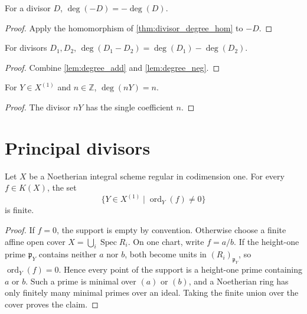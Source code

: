 \begin{lemma}
  \label{lem:degree_neg}
  \leanok
  For a divisor \(D\), \(\deg(-D)=-\deg(D)\).
\end{lemma}
\begin{proof}
  \leanok
  Apply the homomorphism of \cref{thm:divisor_degree_hom} to \(-D\).
\end{proof}

\begin{lemma}
  \label{lem:degree_sub}
  \leanok
  For divisors \(D_1,D_2\),
  \(\deg(D_1-D_2)=\deg(D_1)-\deg(D_2)\).
\end{lemma}
\begin{proof}
  \leanok
  Combine \cref{lem:degree_add} and \cref{lem:degree_neg}.
\end{proof}

\begin{lemma}
  \label{lem:degree_single}
  \leanok
  For \(Y\in X^{(1)}\) and \(n\in\mathbb Z\),
  \(\deg(nY)=n\).
\end{lemma}
\begin{proof}
  \leanok
  The divisor \(nY\) has the single coefficient \(n\).
\end{proof}

\section{Principal divisors}

\begin{lemma}
  \label{lem:rationalMap_order_finite_support}
  \leanok

  Let \(X\) be a Noetherian integral scheme regular in codimension one.
  For every \(f\in K(X)\), the set
  \[
    \{Y\in X^{(1)}\mid\operatorname{ord}_Y(f)\neq0\}
  \]
  is finite.
\end{lemma}
\begin{proof}
  \leanok
  If \(f=0\), the support is empty by convention.  Otherwise choose a finite
  affine open cover \(X=\bigcup_i\operatorname{Spec}R_i\).  On one chart,
  write \(f=a/b\).  If the height-one prime \(\mathfrak p_Y\) contains
  neither \(a\) nor \(b\), both become units in
  \((R_i)_{\mathfrak p_Y}\), so \(\operatorname{ord}_Y(f)=0\).
  Hence every point of the support is a height-one prime containing \(a\)
  or \(b\).  Such a prime is minimal over \((a)\) or \((b)\), and a
  Noetherian ring has only finitely many minimal primes over an ideal.
  Taking the finite union over the cover proves the claim.
\end{proof}

